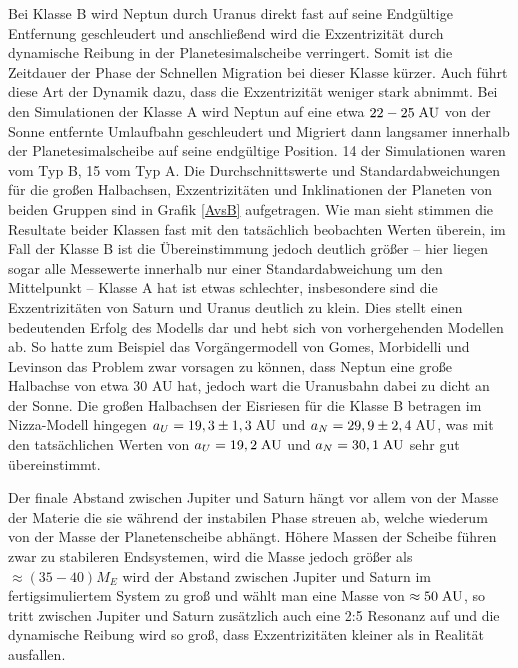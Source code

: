 \documentclass[10pt,a4paper,twoside]{article}
\begin{document}
Bei Klasse B wird Neptun durch Uranus direkt fast auf seine Endgültige Entfernung geschleudert und anschließend wird die Exzentrizität durch dynamische Reibung in der Planetesimalscheibe verringert\cite{Nesvorny2007}. Somit ist die Zeitdauer der Phase der Schnellen Migration bei dieser Klasse kürzer\cite{Tsiganis2005}. Auch führt diese Art der Dynamik dazu, dass die Exzentrizität weniger stark abnimmt\cite{Tsiganis2005}.
Bei den Simulationen der Klasse A wird Neptun auf eine etwa $22-25 \;\mathrm{AU}$ von der Sonne entfernte Umlaufbahn geschleudert und Migriert dann langsamer innerhalb der Planetesimalscheibe auf seine endgültige Position\cite{Tsiganis2005}.
14 der Simulationen waren vom Typ B, 15 vom Typ A. %
Die Durchschnittswerte und Standardabweichungen für die großen Halbachsen, Exzentrizitäten und Inklinationen der Planeten von beiden Gruppen sind in Grafik \ref{AvsB} aufgetragen. Wie man sieht stimmen die Resultate beider Klassen fast mit den tatsächlich beobachten Werten überein, im Fall der Klasse B ist die Übereinstimmung jedoch deutlich größer – hier liegen sogar alle Messewerte innerhalb nur einer Standardabweichung um den Mittelpunkt\cite{Tsiganis2005} – Klasse A hat ist etwas schlechter, insbesondere sind die Exzentrizitäten von Saturn und Uranus deutlich zu klein\cite{Nesvorny2007}\cite{Tsiganis2005}. 
Dies stellt einen bedeutenden Erfolg des Modells dar und hebt sich von vorhergehenden Modellen ab.
So hatte zum Beispiel das Vorgängermodell von Gomes, Morbidelli und Levinson \cite{Gomes2004} %
das Problem zwar vorsagen zu können, dass Neptun eine große Halbachse von etwa 30 AU hat, jedoch wart die Uranusbahn dabei zu dicht an der Sonne.
Die großen Halbachsen der Eisriesen für die Klasse B betragen im Nizza-Modell hingegen $a_U = 19,3 \pm 1,3 \;\mathrm{AU}$ und $a_N = 29,9 \pm 2,4 \;\mathrm{AU}$, was mit den tatsächlichen Werten von $a_U = 19,2 \;\mathrm{AU}$ und $a_N = 30,1 \;\mathrm{AU}$ sehr gut übereinstimmt\cite{Tsiganis2005}.

Der finale Abstand zwischen Jupiter und Saturn hängt vor allem von der Masse der Materie %
die sie während der instabilen Phase streuen ab, welche wiederum von der Masse der Planetenscheibe abhängt\cite{Tsiganis2005}. %
Höhere Massen der Scheibe führen zwar zu stabileren Endsystemen, wird die Masse jedoch größer als $\approx (35-40) M_E$ wird der Abstand zwischen Jupiter und Saturn im fertigsimuliertem System zu groß\cite{Tsiganis2005} und wählt man eine Masse von $\approx 50 \;\mathrm{AU}$, so tritt zwischen Jupiter und Saturn zusätzlich auch eine 2:5 Resonanz auf und die dynamische Reibung wird so groß, dass Exzentrizitäten kleiner als in Realität ausfallen\cite{Tsiganis2005}.
\end{document}
